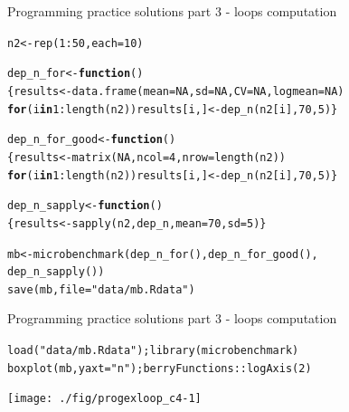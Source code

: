 \documentclass[xcolor=table,           xcolor=dvipsnames]{beamer}\usepackage[]{graphicx}\usepackage[]{color}
\makeatletter
\newcommand{\hlnum}[1]{\textcolor[rgb]{0,0,0}{#1}}
\newcommand{\hlstr}[1]{\textcolor[rgb]{0.545,0.137,0.137}{#1}}
\newcommand{\hlopt}[1]{\textcolor[rgb]{0,0,0}{#1}}
\newcommand{\hlstd}[1]{\textcolor[rgb]{0,0,0}{#1}}
\newcommand{\hlkwa}[1]{\textcolor[rgb]{1,0,0}{\textbf{#1}}}
\newcommand{\hlkwb}[1]{\textcolor[rgb]{0,0,0}{#1}}
\newcommand{\hlkwc}[1]{\textcolor[rgb]{1,0,1}{#1}}
\newcommand{\hlkwd}[1]{\textcolor[rgb]{0,0,1}{#1}}
\newenvironment{kframe}{%
 \def\at@end@of@kframe{}%
 \ifinner\ifhmode%
  \def\at@end@of@kframe{\end{minipage}}%
  \begin{minipage}{\columnwidth}%
 \fi\fi%
 \def\FrameCommand##1{\hskip\@totalleftmargin \hskip-\fboxsep
 \colorbox{shadecolor}{##1}\hskip-\fboxsep
     \hskip-\linewidth \hskip-\@totalleftmargin \hskip\columnwidth}%
 \MakeFramed {\advance\hsize-\width
   \@totalleftmargin\z@ \linewidth\hsize
   \@setminipage}}%
 {\par\unskip\endMakeFramed%
 \at@end@of@kframe}
\newenvironment{knitrout}{}{} %
\makeatother
\begin{document}
\begin{frame}[fragile]{Programming practice solutions part 3 - loops computation}
\begin{knitrout}\small
{}\color{fgcolor}\begin{kframe}
\begin{alltt}
\hlstd{n2} \hlkwb{<-} \hlkwd{rep}\hlstd{(}\hlnum{1}\hlopt{:}\hlnum{50}\hlstd{,} \hlkwc{each}\hlstd{=}\hlnum{10}\hlstd{)}

\hlstd{dep_n_for} \hlkwb{<-} \hlkwa{function}\hlstd{()}
 \hlstd{\{results} \hlkwb{<-} \hlkwd{data.frame}\hlstd{(}\hlkwc{mean}\hlstd{=}\hlnum{NA}\hlstd{,} \hlkwc{sd}\hlstd{=}\hlnum{NA}\hlstd{,} \hlkwc{CV}\hlstd{=}\hlnum{NA}\hlstd{,} \hlkwc{logmean}\hlstd{=}\hlnum{NA}\hlstd{)}
  \hlkwa{for}\hlstd{(i} \hlkwa{in} \hlnum{1}\hlopt{:}\hlkwd{length}\hlstd{(n2)) results[i, ]} \hlkwb{<-} \hlkwd{dep_n}\hlstd{(n2[i],} \hlnum{70}\hlstd{,}\hlnum{5}\hlstd{)\}}

\hlstd{dep_n_for_good} \hlkwb{<-} \hlkwa{function}\hlstd{()}
 \hlstd{\{results} \hlkwb{<-} \hlkwd{matrix}\hlstd{(}\hlnum{NA}\hlstd{,} \hlkwc{ncol}\hlstd{=}\hlnum{4}\hlstd{,} \hlkwc{nrow}\hlstd{=}\hlkwd{length}\hlstd{(n2))}
  \hlkwa{for}\hlstd{(i} \hlkwa{in} \hlnum{1}\hlopt{:}\hlkwd{length}\hlstd{(n2)) results[i, ]} \hlkwb{<-} \hlkwd{dep_n}\hlstd{(n2[i],} \hlnum{70}\hlstd{,}\hlnum{5}\hlstd{)\}}

\hlstd{dep_n_sapply} \hlkwb{<-} \hlkwa{function}\hlstd{()}
\hlstd{\{results} \hlkwb{<-} \hlkwd{sapply}\hlstd{(n2, dep_n,} \hlkwc{mean}\hlstd{=}\hlnum{70}\hlstd{,}\hlkwc{sd}\hlstd{=}\hlnum{5}\hlstd{)\}}

\hlstd{mb} \hlkwb{<-} \hlkwd{microbenchmark}\hlstd{(}\hlkwd{dep_n_for}\hlstd{(),} \hlkwd{dep_n_for_good}\hlstd{(),}
                     \hlkwd{dep_n_sapply}\hlstd{())}
\hlkwd{save}\hlstd{(mb,} \hlkwc{file}\hlstd{=}\hlstr{"data/mb.Rdata"}\hlstd{)}
\end{alltt}
\end{kframe}
\end{knitrout}
\end{frame}


\begin{frame}[fragile]{Programming practice solutions part 3 - loops computation}
\begin{knitrout}
\color{fgcolor}\begin{kframe}
\begin{alltt}
\hlkwd{load}\hlstd{(}\hlstr{"data/mb.Rdata"}\hlstd{);} \hlkwd{library}\hlstd{(microbenchmark)}
\hlkwd{boxplot}\hlstd{(mb,} \hlkwc{yaxt}\hlstd{=}\hlstr{"n"}\hlstd{); berryFunctions}\hlopt{::}\hlkwd{logAxis}\hlstd{(}\hlnum{2}\hlstd{)}
\end{alltt}
\end{kframe}

{\centering \texttt{[image: ./fig/progexloop\_c4-1]} 

}



\end{knitrout}
\end{frame}
\end{document}
